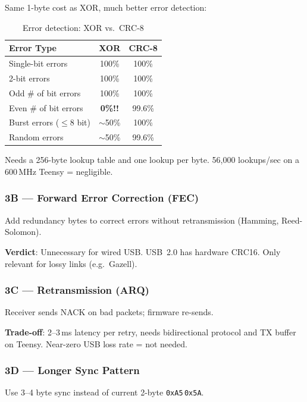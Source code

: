 \documentclass[11pt,a4paper]{article}
\newcommand{\hexval}[1]{\texttt{0x#1}}
\begin{document}
Same 1-byte cost as XOR, much better error detection:

\begin{table}[H]
\centering
\begin{tabular}{|l|c|c|}
\hline
\textbf{Error Type} & \textbf{XOR} & \textbf{CRC-8} \\\hline
\hline
Single-bit errors & 100\% & 100\% \\
2-bit errors & 100\% & 100\% \\
Odd \# of bit errors & 100\% & 100\% \\
Even \# of bit errors & \textbf{0\%!!} & 99.6\% \\
Burst errors ($\leq$8 bit) & ${\sim}$50\% & 100\% \\
Random errors & ${\sim}$50\% & 99.6\% \\
\hline
\end{tabular}
\caption{Error detection: XOR vs.\ CRC-8}
\end{table}

Needs a 256-byte lookup table and one lookup per byte. 56,000 lookups/sec on a 600\,MHz Teensy = negligible.

\subsubsection{3B --- Forward Error Correction (FEC)}

Add redundancy bytes to correct errors without retransmission (Hamming, Reed-Solomon).

\textbf{Verdict}: Unnecessary for wired USB. USB~2.0 has hardware CRC16. Only relevant for lossy links (e.g.\ Gazell).

\subsubsection{3C --- Retransmission (ARQ)}

Receiver sends NACK on bad packets; firmware re-sends.

\textbf{Trade-off}: 2--3\,ms latency per retry, needs bidirectional protocol and TX buffer on Teensy. Near-zero USB loss rate = not needed.

\subsubsection{3D --- Longer Sync Pattern}

Use 3--4 byte sync instead of current 2-byte \hexval{A5}\,\hexval{5A}.
\end{document}
